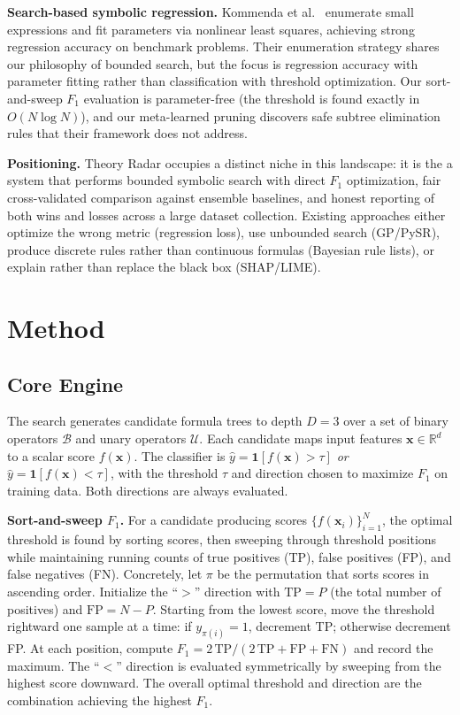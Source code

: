 \documentclass[journal]{IEEEtran}
\begin{document}
\textbf{Search-based symbolic regression.}
Kommenda et al.~\cite{kommenda2020search} enumerate small expressions
and fit parameters via nonlinear least squares, achieving strong
regression accuracy on benchmark problems.  Their enumeration
strategy shares our philosophy of bounded search, but the focus is
regression accuracy with parameter fitting rather than classification
with threshold optimization.  Our sort-and-sweep $F_1$ evaluation is
parameter-free (the threshold is found exactly in $O(N \log N)$),
and our meta-learned pruning discovers safe subtree elimination rules
that their framework does not address.

\textbf{Positioning.}
Theory Radar occupies a distinct niche in this landscape: it is the
a system that performs bounded symbolic search
with direct $F_1$ optimization, fair cross-validated comparison
against ensemble baselines, and honest reporting of both wins and
losses across a large dataset collection.  Existing approaches either
optimize the wrong metric (regression loss), use unbounded search
(GP/PySR), produce discrete rules rather than continuous formulas
(Bayesian rule lists), or explain rather than replace the black box
(SHAP/LIME).

\section{Method}
\label{sec:method}

\subsection{Core Engine}
\label{sec:core}

The search generates candidate formula trees to depth $D = 3$ over a
set of binary operators $\mathcal{B}$ and unary operators
$\mathcal{U}$.  Each candidate maps input features
$\mathbf{x} \in \mathbb{R}^d$ to a scalar score $f(\mathbf{x})$.
The classifier is
$\hat{y} = \mathbf{1}[f(\mathbf{x}) > \tau]$ \emph{or}
$\hat{y} = \mathbf{1}[f(\mathbf{x}) < \tau]$, with the threshold
$\tau$ and direction chosen to maximize $F_1$ on training data.
Both directions are always evaluated.

\textbf{Sort-and-sweep $F_1$.}
For a candidate producing scores $\{f(\mathbf{x}_i)\}_{i=1}^N$,
the optimal threshold is found by sorting scores, then sweeping
through threshold positions while maintaining running counts of
true positives (TP), false positives (FP), and false negatives (FN).
Concretely, let $\pi$ be the permutation that sorts scores in
ascending order.  Initialize the ``$>$'' direction with
$\mathrm{TP} = P$ (the total number of positives) and $\mathrm{FP} = N - P$.
Starting from the lowest score, move the threshold rightward one
sample at a time: if $y_{\pi(i)} = 1$, decrement TP; otherwise
decrement FP.  At each position, compute
$F_1 = 2\,\mathrm{TP} / (2\,\mathrm{TP} + \mathrm{FP} + \mathrm{FN})$
and record the maximum.  The ``$<$'' direction is evaluated
symmetrically by sweeping from the highest score downward.  The
overall optimal threshold and direction are the combination
achieving the highest $F_1$.
\end{document}
